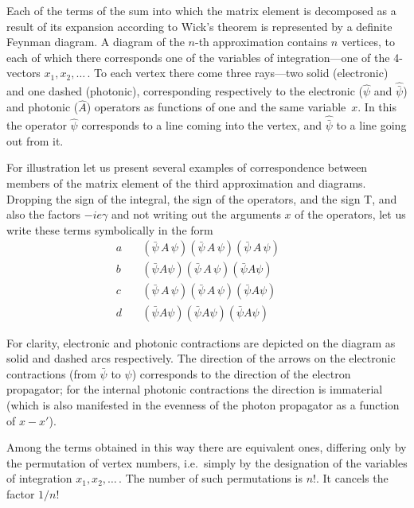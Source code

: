 Each of the terms of the sum into which the matrix element is decomposed as a result of its expansion according to Wick's theorem is represented by a definite Feynman diagram. A diagram of the $n$-th approximation contains $n$ vertices, to each of which there corresponds one of the variables of integration---one of the 4-vectors $x_1, x_2, \ldots$\,. To each vertex there come three rays---two solid (electronic) and one dashed (photonic), corresponding respectively to the electronic ($\hat{\psi}$ and $\hat{\bar{\psi}}$) and photonic ($\hat{A}$) operators as functions of one and the same variable~$x$. In this the operator $\hat{\psi}$ corresponds to a line coming into the vertex, and $\hat{\bar{\psi}}$ to a line going out from it.

For illustration let us present several examples of correspondence between members of the matrix element of the third approximation and diagrams. Dropping the sign of the integral, the sign of the operators, and the sign T, and also the factors $-ie\gamma$ and not writing out the arguments $x$ of the operators, let us write these terms symbolically in the form
\begin{equation}
\begin{aligned}
a\quad &(\bar{\psi}\,A\,\psi)(\bar{\psi}\,A\,\psi)(\bar{\psi}\,A\,\psi) &&\\[4pt]
b\quad &(\bar{\psi}A\psi)(\bar{\psi}\,A\,\psi)(\bar{\psi}A\psi) &&\\[4pt]
c\quad &(\bar{\psi}\,A\,\psi)(\bar{\psi}\,A\,\psi)(\bar{\psi}A\psi) &&\\[4pt]
d\quad &(\bar{\psi}A\psi)(\bar{\psi}A\psi)(\bar{\psi}A\psi) &&
\end{aligned}
\tag{77.4}
\end{equation}

For clarity, electronic and photonic contractions are depicted on the diagram as solid and dashed arcs respectively. The direction of the arrows on the electronic contractions (from $\bar{\psi}$ to $\psi$) corresponds to the direction of the electron propagator; for the internal photonic contractions the direction is immaterial (which is also manifested in the evenness of the photon propagator as a function of $x - x'$).

Among the terms obtained in this way there are equivalent ones, differing only by the permutation of vertex numbers, i.e.\ simply by the designation of the variables of integration $x_1, x_2,\ldots$\,. The number of such permutations is $n!$. It cancels the factor $1/n!$

